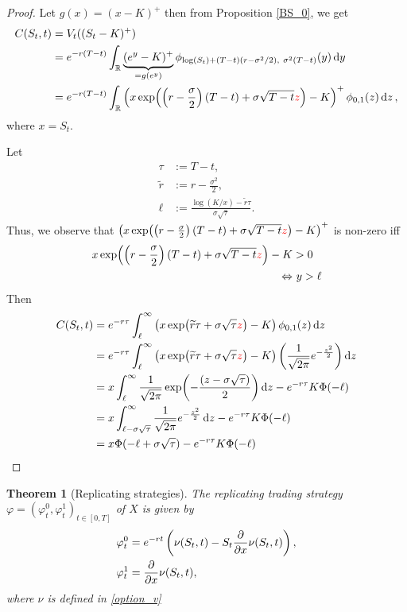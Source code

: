 \documentclass[10pt]{article}
\theoremstyle{remark}
\theoremstyle{plain}
\newtheorem{Theorem}{Theorem}[section]
\newcommand{\R}{\mathbb{R}}
\numberwithin{equation}{section}
\renewcommand{\tilde}{\widetilde}
\begin{document}
\begin{proof}
	Let $g(x) = (x-K)^+$ then from Proposition \ref{BS_0}, we get
	\begin{align*}
	C(S_t,t) & = V_t((S_t-K)^+) \\
	& = e^{-r(T-t)} \int_\R \underbrace{(e^y-K)^+}_{=g(e^y)}  \phi_{\log(S_t)+ (T-t)(r-\sigma^2/2),\ \sigma^2(T-t)} (y) \dd{y}
	\\
	& = e^{-r(T-t)} \int_\R \left(x \exp(\left(r-\frac{\sigma}{2}\right)(T-t) + \sigma\sqrt{T-t}{\color{red}z}) - K\right)^+ \phi_{0,1}(z) \dd{z},
	\end{align*}
	where $x = S_t$.
	
	Let
	\begin{align*}
		\tau & := T-t,\\
		\tilde{r} &:= r-\frac{\sigma^2}{2},\\
		\ell &:= \frac{\log(K/x) - \tilde{r}\tau}{\sigma \sqrt{\tau}}.
	\end{align*}
	Thus, we observe that $\left(x \exp(\left(r-\frac{\sigma}{2}\right)(T-t) + \sigma\sqrt{T-t}{\color{red}z}) - K\right)^+$ is non-zero iff
	\begin{align*}
		x \exp(\left(r-\frac{\sigma}{2}\right)(T-t) + \sigma\sqrt{T-t}{\color{red}z}) - K  & > 0 \\
		\Leftrightarrow &\ y > \ell
	\end{align*}
	Then
	\begin{align*}
		C(S_t,t) & = e^{-r\tau} \int_\ell^\infty \left(x \exp(\tilde{r}\tau + \sigma\sqrt{\tau}{\color{red}z}) - K\right) \phi_{0,1}(z) \dd{z} 
		\\
		& = e^{-r\tau} \int_\ell^\infty \left(x \exp(\tilde{r}\tau + \sigma\sqrt{\tau}{\color{red}z}) - K\right) \left(\frac{1}{\sqrt{2\pi}} e^{-\frac{z^2}{2}}\right) \dd{z} 
		\\
		& = x \int_\ell^\infty \frac{1}{\sqrt{2\pi}} \exp(-\frac{(z-\sigma\sqrt{\tau})}{2}) \dd{z} - e^{-r\tau} K \Phi(-\ell)
		\\
		& = x \int^\infty_{\ell - \sigma\sqrt{\tau}} \frac{1}{\sqrt{2\pi}} e^{-\frac{z^2}{2}} \dd{z}- e^{-r\tau} K \Phi(-\ell)
		\\
		& = x \Phi(-\ell + \sigma\sqrt{\tau}) - e^{-r\tau} K \Phi(-\ell)
	\end{align*}
\end{proof}

\begin{Theorem}[Replicating strategies]
	The replicating trading strategy $\varphi = (\varphi^0_t, \varphi^1_t)_{t\in[0,T]}$ of $X$ is given by 
	\begin{equation}
		\begin{aligned}
			\varphi^0_t &= e^{-rt} \left(\nu(S_t,t) - S_t \pdv{x}\nu(S_t,t) \right),\\
			\varphi^1_t &= \pdv{x} \nu(S_t,t),
		\end{aligned}
	\end{equation}
	where $\nu$ is defined in \eqref{option_v}
\end{Theorem}
\end{document}
